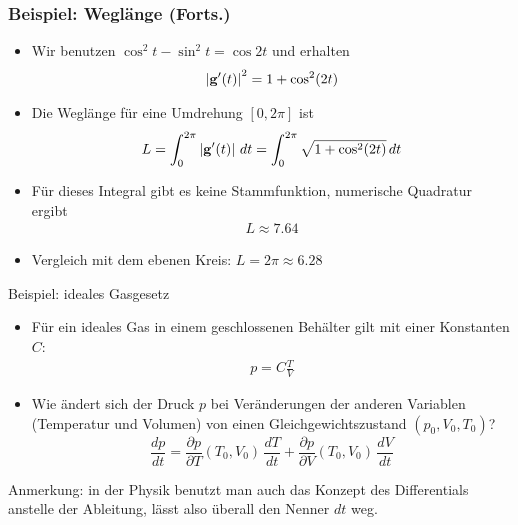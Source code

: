 \begin{frame}
  \frametitle<presentation>{Beispiel: Weglänge (Forts.)}
  \begin{itemize}
  \item Wir benutzen $\cos^2t-\sin^2t = \cos 2t$ und erhalten
    \begin{gather*}
      \left|\mathbf{g}'(t)\right|^2 = 1+\cos^2(2t)
    \end{gather*}
  \item Die Weglänge für eine Umdrehung $[0,2\pi]$ ist
    \begin{gather*}
      L = \int_0^{2\pi} \left|\mathbf{g}'(t)\right|\,dt
      = \int_0^{2\pi} \sqrt{1+\cos^2(2t)}\,dt
    \end{gather*}
  \item Für dieses Integral gibt es keine Stammfunktion, numerische
    Quadratur ergibt
    \begin{gather*}
      L \approx 7.64
    \end{gather*}
    \item Vergleich mit dem \glqq{}ebenen\grqq{} Kreis: $L=2\pi\approx 6.28$
  \end{itemize}
\end{frame}


\begin{frame}{Beispiel: ideales Gasgesetz}
      \begin{itemize}
      \item Für ein ideales Gas in einem geschlossenen Behälter gilt
        mit einer Konstanten $C$:
        \begin{gather*}
         p = C\frac{T}{V}
        \end{gather*}
      \item Wie ändert sich der Druck $p$ bei Veränderungen der
        anderen Variablen (Temperatur und Volumen) von einen
        Gleichgewichtszustand $(p_0,V_0,T_0)$?
        \pause
        \begin{equation}
          \frac{dp}{dt}
          = \frac{\partial p}{\partial T}(T_0,V_0)\,\frac{dT}{dt}
          +\frac{\partial p}{\partial V}(T_0,V_0)\,\frac{dV}{dt}
        \end{equation}
      \end{itemize}
      \pause Anmerkung: in der Physik benutzt man auch das Konzept des
      Differentials anstelle der Ableitung, lässt also überall den
      Nenner $dt$ weg.
\end{frame}

